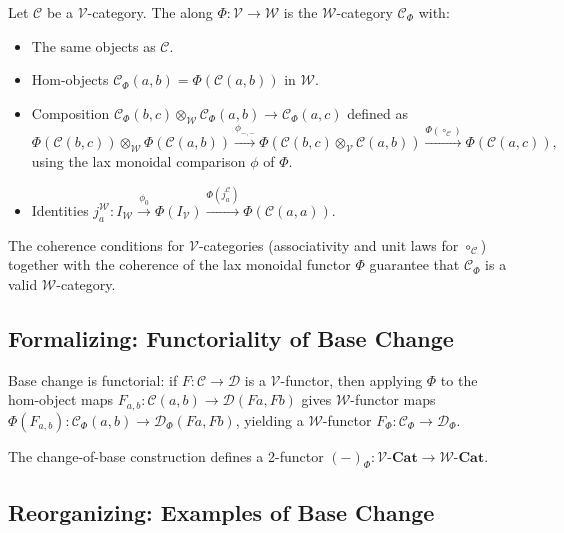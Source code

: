 Let $\mathcal{C}$ be a $\mathcal{V}$-category. The  along
$\Phi : \mathcal{V} \to \mathcal{W}$ is the $\mathcal{W}$-category
$\mathcal{C}_\Phi$ with:
\begin{itemize}
  \item The same objects as $\mathcal{C}$.
  \item Hom-objects $\mathcal{C}_\Phi(a, b) = \Phi(\mathcal{C}(a, b))$ in $\mathcal{W}$.
  \item Composition $\mathcal{C}_\Phi(b,c) \otimes_\mathcal{W} \mathcal{C}_\Phi(a,b)
        \to \mathcal{C}_\Phi(a,c)$ defined as
        \begin{equation*}
          \Phi(\mathcal{C}(b,c)) \otimes_\mathcal{W} \Phi(\mathcal{C}(a,b))
          \xrightarrow{\phi_{-,-}} \Phi(\mathcal{C}(b,c) \otimes_\mathcal{V}
          \mathcal{C}(a,b)) \xrightarrow{\Phi(\circ_\mathcal{C})} \Phi(\mathcal{C}(a,c)),
        \end{equation*}
        using the lax monoidal comparison $\phi$ of $\Phi$.
  \item Identities $j_a^\mathcal{W} : I_\mathcal{W} \xrightarrow{\phi_0}
        \Phi(I_\mathcal{V}) \xrightarrow{\Phi(j_a^\mathcal{C})} \Phi(\mathcal{C}(a,a))$.
\end{itemize}

The coherence conditions for $\mathcal{V}$-categories (associativity and unit
laws for $\circ_\mathcal{C}$) together with the coherence of the lax monoidal
functor $\Phi$ guarantee that $\mathcal{C}_\Phi$ is a valid $\mathcal{W}$-category.

\subsection{Formalizing: Functoriality of Base Change}

Base change is functorial: if $F : \mathcal{C} \to \mathcal{D}$ is a
$\mathcal{V}$-functor, then applying $\Phi$ to the hom-object maps $F_{a,b} :
\mathcal{C}(a,b) \to \mathcal{D}(Fa, Fb)$ gives $\mathcal{W}$-functor maps
$\Phi(F_{a,b}) : \mathcal{C}_\Phi(a,b) \to \mathcal{D}_\Phi(Fa,Fb)$, yielding
a $\mathcal{W}$-functor $F_\Phi : \mathcal{C}_\Phi \to \mathcal{D}_\Phi$.

\begin{proposition}
The change-of-base construction defines a 2-functor
$(-)_\Phi : \mathcal{V}\text{-}\mathbf{Cat} \to \mathcal{W}\text{-}\mathbf{Cat}$.
\end{proposition}

\subsection{Reorganizing: Examples of Base Change}

